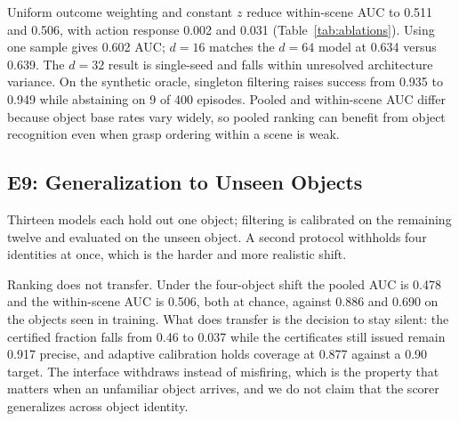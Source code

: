 \documentclass[letterpaper, 10pt, conference]{ieeeconf}
\begin{document}
Uniform outcome weighting and constant $z$ reduce within-scene AUC to
0.511 and 0.506, with action response 0.002 and 0.031
(Table~\ref{tab:ablations}). Using one sample gives 0.602 AUC\@; $d=16$ matches
the $d=64$ model at 0.634 versus 0.639. The $d=32$ result is single-seed and
falls within unresolved architecture variance. On the synthetic oracle,
singleton filtering raises success from 0.935 to 0.949 while abstaining on 9
of 400 episodes. Pooled and within-scene AUC differ because object base rates
vary widely, so pooled ranking can benefit from object recognition even when
grasp ordering within a scene is weak.

\subsection{E9: Generalization to Unseen Objects}
\label{sec:loo}
Thirteen models each hold out one object; filtering is calibrated on the
remaining twelve and evaluated on the unseen object. A second protocol withholds four
identities at once, which is the harder and more realistic shift.

Ranking does not transfer. Under the four-object shift the pooled AUC is 0.478 and the
within-scene AUC is 0.506, both at chance, against 0.886 and 0.690 on the objects seen in
training. What does transfer is the decision to stay silent: the certified fraction falls
from 0.46 to 0.037 while the certificates still issued remain 0.917 precise, and adaptive
calibration holds coverage at 0.877 against a 0.90 target. The interface withdraws instead
of misfiring, which is the property that matters when an unfamiliar object arrives, and we
do not claim that the scorer generalizes across object identity.
\end{document}

